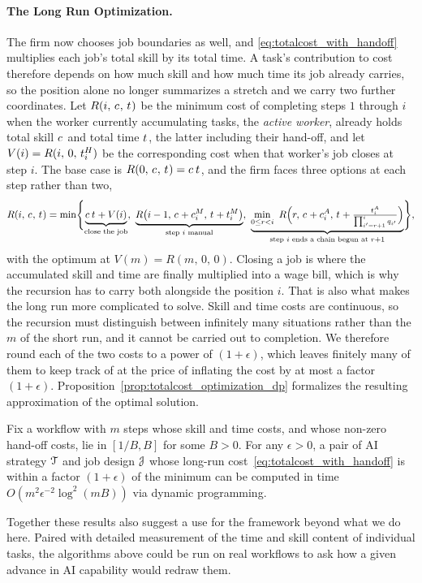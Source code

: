 \paragraph{The Long Run Optimization.}
The firm now chooses job boundaries as well, and \eqref{eq:totalcost_with_handoff} multiplies each job's total skill by its total time.
A task's contribution to cost therefore depends on how much skill and how much time its job already carries, so the position alone no longer summarizes a stretch and we carry two further coordinates.
Let $R(i,\, c_{},\, t_{})$ be the minimum cost of completing steps $1$ through $i$ when the worker currently accumulating tasks, the \emph{active worker}, already holds total skill $c_{}$ and total time $t_{}$, the latter including their hand-off, and let $V(i) = R(i,\, 0,\, t^{H}_{i})$ be the corresponding cost when that worker's job closes at step $i$.
The base case is $R(0,\, c_{},\, t_{}) = c_{}\,t_{}$, and the firm faces three options at each step rather than two,
\begin{align}
\label{eq:longrun_recursion}
R(i,\, \skillcost{},\, \timecost{}) = \min\Biggl\{ \underbrace{\skillcost{}\,\timecost{} + V(i)}_{\text{close the job}}, \ \underbrace{R\bigl(i-1,\, \skillcost{} + \manualSkill{i},\, \timecost{} + \manualTime{i}\bigr)}_{\text{step $i$ manual}}, \ \underbrace{\min_{0 \le r < i}\ R\Bigl(r,\, \skillcost{} + \AIskill{i},\, \timecost{} + \tfrac{\AItime{i}}{\prod_{i'=r+1}^{i} q_{i'}}\Bigr)}_{\text{step $i$ ends a chain begun at } r+1} \Biggr\},
\end{align}
with the optimum at $V(m) = R(m,\, 0,\, 0)$.
Closing a job is where the accumulated skill and time are finally multiplied into a wage bill, which is why the recursion has to carry both alongside the position $i$.
That is also what makes the long run more complicated to solve.
Skill and time costs are continuous, so the recursion must distinguish between infinitely many situations rather than the $m$ of the short run, and it cannot be carried out to completion.
We therefore round each of the two costs to a power of $(1+\epsilon)$, which leaves finitely many of them to keep track of at the price of inflating the cost by at most a factor $(1+\epsilon)$.
Proposition~\ref{prop:totalcost_optimization_dp} formalizes the resulting approximation of the optimal solution.
\begin{proposition}
\label{prop:totalcost_optimization_dp}
Fix a workflow with $m$ steps whose skill and time costs, and whose non-zero hand-off costs, lie in $[1/B, B]$ for some $B > 0$.
For any $\epsilon > 0$, a pair of AI strategy $\mathcal{T}$ and job design $\mathcal{J}$ whose long-run cost~\eqref{eq:totalcost_with_handoff} is within a factor $(1+\epsilon)$ of the minimum can be computed in time $O(m^2 \epsilon^{-2} \log^2(mB))$ via dynamic programming.
\end{proposition}

Together these results also suggest a use for the framework beyond what we do here.
Paired with detailed measurement of the time and skill content of individual tasks, the algorithms above could be run on real workflows to ask how a given advance in AI capability would redraw them.
